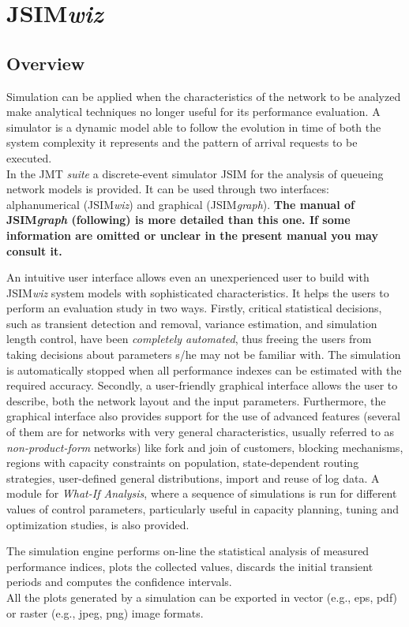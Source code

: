 \chapter{JSIM\emph{wiz}}
\label{cha:jsimwiz}
\section{Overview}
Simulation can be applied when the characteristics of
the network to be analyzed make analytical techniques no
longer useful for its performance evaluation. A simulator is a
dynamic model able to follow the evolution in time of both the
system complexity it represents and the pattern of arrival
requests to be executed.\\
In the JMT \emph{suite} a discrete-event simulator JSIM for the
analysis of queueing network models is provided. It can be used
through two interfaces: alphanumerical (JSIM\emph{wiz}) and
graphical (JSIM\emph{graph}). \textbf{The manual of
JSIM\emph{graph} (following) is more detailed than this one. If
some information are omitted or unclear in the present manual you
may consult it.}

An intuitive user interface allows even an unexperienced user to
build with JSIM\emph{wiz} system models with sophisticated
characteristics. It helps the users to perform an evaluation study
in two ways. Firstly, critical statistical decisions, such as
transient detection and removal, variance estimation, and
simulation length control, have been \emph{completely automated},
thus freeing the users from taking decisions about parameters s/he
may not be familiar with. The simulation is automatically stopped
when all performance indexes can be estimated with the required
accuracy. Secondly, a user-friendly graphical interface allows the
user to describe, both the network layout and the input
parameters. Furthermore, the graphical interface also provides
support for the use of advanced features (several of them are for
networks with very general characteristics, usually referred to as
\emph{non-product-form} networks) like fork and join of customers,
blocking mechanisms, regions with capacity constraints on
population, state-dependent routing strategies, user-defined
general distributions, import and reuse of log data. A module for
\emph{What-If Analysis}, where a sequence of simulations is run
for different values of control parameters, particularly useful in
capacity planning, tuning and optimization studies, is also
provided.

The simulation engine performs on-line the statistical analysis of
measured performance indices, plots the collected values, discards
the initial
transient periods and computes the confidence intervals.\\
All the plots generated by a simulation can be exported in vector
(e.g., eps, pdf) or raster (e.g., jpeg,
png) image formats.\\

